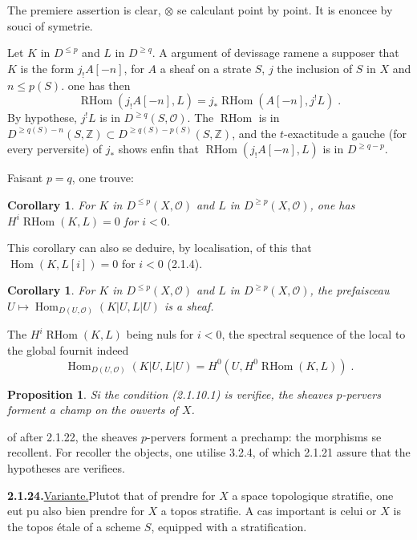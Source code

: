 \documentclass[12pt,a4paper]{article}
\theoremstyle{plain}
\newtheorem{proposition}[theorem]{Proposition}
\newtheorem{corollary}[theorem]{Corollary}
\theoremstyle{definition}
\DeclareMathOperator{\Hom}{Hom}
\DeclareMathOperator{\RHom}{RHom}
\begin{document}
The premiere assertion is clear, $\otimes$ se calculant point by point. It is enoncee by souci of symetrie.

Let $K$ in $D^{\leqslant p}$ and $L$ in $D^{\geqslant q}$. A argument of devissage ramene a supposer that $K$ is the form $j_! A[-n]$, for $A$ a sheaf on a strate $S$, $j$ the inclusion of $S$ in $X$ and $n \leqslant p(S)$. one has then
\[
\RHom(j_! A[-n], L) = j_* \RHom(A[-n], j^! L)\;.
\]
By hypothese, $j^! L$ is in $D^{\geqslant q}(S, \mathcal{O})$. The $\RHom$ is in $D^{\geqslant q(S) - n}(S, \mathbb{Z}) \subset D^{\geqslant q(S) - p(S)}(S, \mathbb{Z})$, and the $t$-exactitude a gauche (for every perversite) of $j_*$ shows enfin that $\RHom(j_! A[-n], L)$ is in $D^{\geqslant q-p}$.

Faisant $p = q$, one trouve:

\begin{corollary}\label{cor:2.1.21}
For $K$ in $D^{\leqslant p}(X, \mathcal{O})$ and $L$ in $D^{\geqslant p}(X, \mathcal{O})$, one has $H^i \RHom(K, L) = 0$ for $i < 0$.
\end{corollary}

This corollary can also se deduire, by localisation, of this that $\Hom(K, L[i]) = 0$ for $i < 0$ (2.1.4).

\begin{corollary}\label{cor:2.1.22}
For $K$ in $D^{\leqslant p}(X, \mathcal{O})$ and $L$ in $D^{\geqslant p}(X, \mathcal{O})$, the prefaisceau $U \mapsto \Hom_{D(U, \mathcal{O})}(K|U, L|U)$ is a sheaf.
\end{corollary}

The $H^i \RHom(K, L)$ being nuls for $i < 0$, the spectral sequence of the local to the global fournit indeed
\[
\Hom_{D(U, \mathcal{O})}(K|U, L|U) = H^0(U, H^0 \RHom(K, L))\;.
\]

\begin{proposition}\label{prop:2.1.23}
Si the condition (2.1.10.1) is verifiee, the sheaves $p$-pervers forment a champ on the ouverts of $X$.
\end{proposition}

of after 2.1.22, the sheaves $p$-pervers forment a prechamp: the morphisms se recollent. For recoller the objects, one utilise 3.2.4, of which 2.1.21 assure that the hypotheses are verifiees.

\smallskip
\noindent\textbf{2.1.24.}\quad \underline{Variante.}\quad Plutot that of prendre for $X$ a space topologique stratifie, one eut pu also bien prendre for $X$ a topos stratifie. A cas important is celui or $X$ is the topos étale of a scheme $S$, equipped with a stratification.
\end{document}
